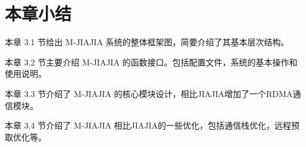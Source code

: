 {    \section{本章小结}
    本章 3.1 节给出 M-JIAJIA 系统的整体框架图，简要介绍了其基本层次结构。

    本章 3.2 节主要介绍 M-JIAJIA 的函数接口。包括配置文件，系统的基本操作和使用说明。

    本章 3.3 节介绍了 M-JIAJIA 的核心模块设计，相比JIAJIA增加了一个RDMA通信模块。

    本章 3.4 节介绍了 M-JIAJIA 相比JIAJIA的一些优化，包括通信栈优化，远程预取优化等。
}
